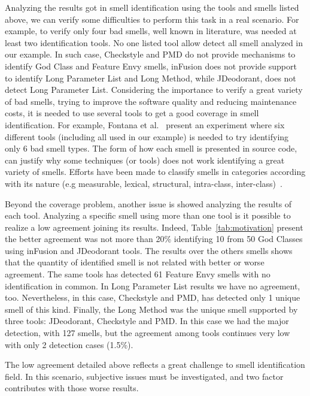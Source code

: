 \documentclass[conference]{IEEEtran}
\begin{document}
Analyzing the results got in smell identification using the tools and smells listed above, we can verify some difficulties to perform this task in a real scenario. For example, to verify only four bad smells, well known in literature, was needed at least two identification tools. No one listed tool allow detect all smell analyzed in our example. In such case, Checkstyle and PMD do not provide mechanisms to identify God Class and Feature Envy smells, inFusion does not provide support to identify Long Parameter List and Long Method, while JDeodorant, does not detect Long Parameter List. Considering the importance to verify a great variety of bad smells, trying to improve the software quality and reducing maintenance costs, it is needed to use several tools to get a good coverage in smell identification. For example, Fontana et al.~\cite{Fontana2012c} present an experiment where six different tools (including all used in our example) is needed to try identifying only 6 bad smell types. The form of how each smell is presented in source code, can justify why some techniques (or tools) does not work identifying a great variety of smells. Efforts have been made to classify smells in categories according with its nature (e.g measurable, lexical, structural, intra-class, inter-class)~\cite{Wake:2003,Mantyla:2003}.

Beyond the coverage problem, another issue is showed analyzing the results of each tool. Analyzing a specific smell using more than one tool is it possible to realize a low agreement joining its results. Indeed, Table~\ref{tab:motivation} present the better agreement was not more than 20\% identifying 10 from 50 God Classes using inFusion and JDeodorant tools. The results over the others smells shows that the quantity of identified smell is not related with better or worse agreement. The same tools has detected 61 Feature Envy smells with no identification in common. In Long Parameter List results we have no agreement, too. Nevertheless, in this case, Checkstyle and PMD, has detected only 1 unique smell of this kind. Finally, the Long Method was the unique smell supported by three tools: JDeodorant, Checkstyle and PMD. In this case we had the major detection, with 127 smells, but the agreement among tools continues very low with only 2 detection cases (1.5\%). 

The low agreement detailed above reflects a great challenge to smell identification field. In this scenario, subjective issues must be investigated, and two factor contributes with those worse results. 
\end{document}
